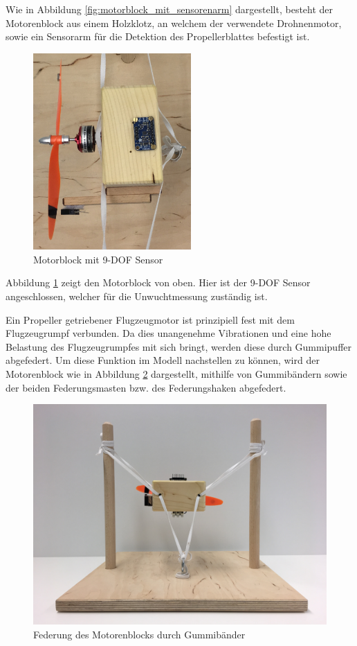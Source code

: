 Wie in Abbildung \ref{fig:motorblock_mit_sensorenarm} dargestellt, besteht der Motorenblock aus einem Holzklotz, an welchem der verwendete Drohnenmotor, sowie ein Sensorarm für die Detektion des Propellerblattes befestigt ist.
\begin{figure}[H]
	\centering
	\includegraphics[height=7.5cm]{images/chapter/03/motorblock_top.jpg}
	\caption{Motorblock mit \ac{9-DOF} Sensor}
	\label{fig:motorblock_top}
\end{figure}
Abbildung \ref{fig:motorblock_top} zeigt den Motorblock von oben.
Hier ist der \ac{9-DOF} Sensor angeschlossen, welcher für die Unwuchtmessung zuständig ist.

Ein Propeller getriebener Flugzeugmotor ist prinzipiell fest mit dem Flugzeugrumpf verbunden.
Da dies unangenehme Vibrationen und eine hohe Belastung des Flugzeugrumpfes mit sich bringt, werden diese durch Gummipuffer abgefedert.
Um diese Funktion im Modell nachstellen zu können, wird der Motorenblock wie in Abbildung \ref{fig:motorblock_federung} dargestellt, mithilfe von Gummibändern sowie der beiden Federungsmasten bzw. des Federungshaken abgefedert.
\begin{figure}[H]
	\centering
	\includegraphics[width=.9\textwidth]{images/chapter/03/motorblock_federung.jpg}
	\caption{Federung des Motorenblocks durch Gummibänder}
	\label{fig:motorblock_federung}
\end{figure}

